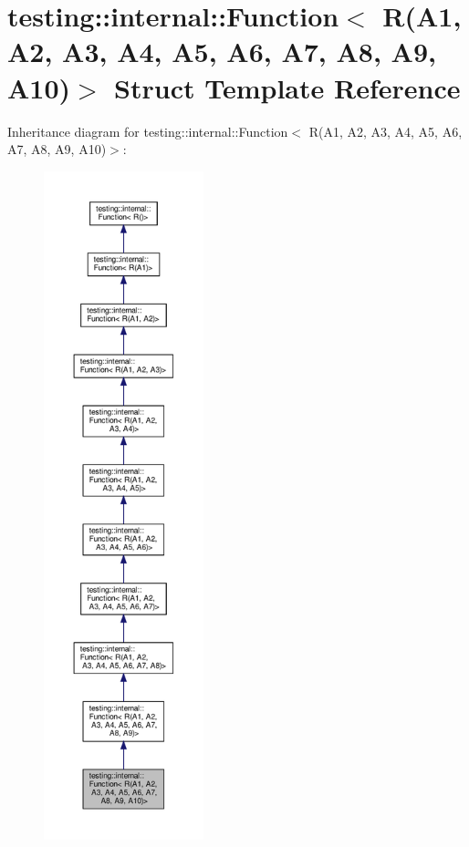 \hypertarget{structtesting_1_1internal_1_1_function_3_01_r_07_a1_00_01_a2_00_01_a3_00_01_a4_00_01_a5_00_01_a6f6ff91550f0557b7708e490e5002cd35}{}\section{testing\+:\+:internal\+:\+:Function$<$ R(A1, A2, A3, A4, A5, A6, A7, A8, A9, A10)$>$ Struct Template Reference}
\label{structtesting_1_1internal_1_1_function_3_01_r_07_a1_00_01_a2_00_01_a3_00_01_a4_00_01_a5_00_01_a6f6ff91550f0557b7708e490e5002cd35}


Inheritance diagram for testing\+:\+:internal\+:\+:Function$<$ R(A1, A2, A3, A4, A5, A6, A7, A8, A9, A10)$>$\+:
\nopagebreak
\begin{figure}[H]
\begin{center}
\leavevmode
\includegraphics[height=550pt]{structtesting_1_1internal_1_1_function_3_01_r_07_a1_00_01_a2_00_01_a3_00_01_a4_00_01_a5_00_01_a697aa8fe85a89666d749983fe56b1a994}
\end{center}
\end{figure}


